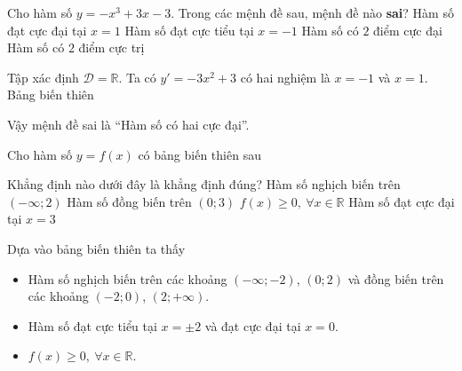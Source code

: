 \begin{ex}%
 Cho hàm số $y=-x^3+3x-3$. Trong các mệnh đề sau, mệnh đề nào {\bfseries sai}?
 \choice
  {Hàm số đạt cực đại tại $x=1$}
  {Hàm số đạt cực tiểu tại $x=-1$}
  {\True Hàm số có $2$ điểm cực đại}
  {Hàm số có $2$ điểm cực trị}
 \loigiai
  {
  Tập xác định $\mathscr{D}=\mathbb{R}$. Ta có $y'=-3x^2+3$ có hai nghiệm là $x=-1$ và $x=1$. Bảng biến thiên
  \begin{center}
  \end{center}
  Vậy mệnh đề sai là ``Hàm số có hai cực đại''.
  }
\end{ex}

\begin{ex}%
 Cho hàm số $y=f(x)$ có bảng biến thiên sau
 \begin{center}
 \end{center}
 Khẳng định nào dưới đây là khẳng định đúng?
 \choice
  {Hàm số nghịch biến trên $(-\infty;2)$}
  {Hàm số đồng biến trên $(0;3)$}
  {\True $f(x)\geq 0,\ \forall x\in\mathbb{R}$}
  {Hàm số đạt cực đại tại $x=3$}
 \loigiai
  {
  Dựa vào bảng biến thiên ta thấy
  \begin{itemize}
   \item Hàm số nghịch biến trên các khoảng $(-\infty;-2)$, $(0;2)$ và đồng biến trên các khoảng $(-2;0)$, $(2;+\infty)$.
   \item Hàm số đạt cực tiểu tại $x=\pm 2$ và đạt cực đại tại $x=0$.
   \item $f(x)\geq 0,\ \forall x\in\mathbb{R}$.
  \end{itemize}
  }
\end{ex}

